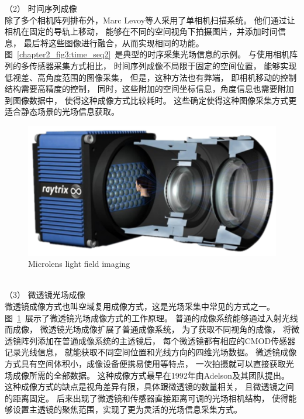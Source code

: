（2）
时间序列成像
\\
%
%
%
%
\indent
除了多个相机阵列排布外，Marc Levoy等人采用了单相机扫描系统。
他们通过让相机在固定的导轨上移动，
能够在不同的空间视角下拍摄图片，并添加时间信息，
最后将这些图像进行融合，从而实现相同的功能。
图~\ref{chapter2_fig3:time_seq2}~是典型的时序采集光场信息的示例。
与使用相机阵列的多传感器采集方式相比，
时间序列成像不局限于固定的空间位置，
能够实现低视差、高角度范围的图像采集，
但是，这种方法也有弊端，
即相机移动的控制结构需要高精度的控制，
同时，这些附加的空间坐标信息，角度信息也需要附加到图像数据中，
使得这种成像方式比较耗时。
这些确定使得这种图像采集方式更适合静态场景的光场信息获取。
\begin{figure}[b]
	\centering
	\includegraphics[width=0.65\linewidth]{figures/chapter2/microlens_for_lf_imaging2.drawio}
	{Microlens light field imaging}  
	\label{chapter2_fig4:microlens_for_lf_imaging}
\end{figure}
\\
%
%
%
%
\indent
（3）
微透镜光场成像
\\
%
%
%
%
\indent
微透镜成像方式也叫空域复用成像方式，这是光场采集中常见的方式之一。
图~\ref{chapter2_fig4:microlens_for_lf_imaging}~展示了微透镜光场成像方式的工作原理。
普通的成像系统能够通过入射光线而成像，
微透镜光场成像扩展了普通成像系统，
为了获取不同视角的成像，
将微透镜阵列添加在普通成像系统的主透镜后，
每个微透镜都有相应的CMOD传感器记录光线信息，
就能获取不同空间位置和光线方向的四维光场数据。
微透镜成像方式具有空间体积小，成像设备便携易使用等特点，
一次拍摄就可以直接获取光场成像所需的全部数据。
这种成像方式最早在1992年由Adelson及其团队提出。
这种成像方式的缺点是视角差异有限，具体跟微透镜的数量相关，
且微透镜之间的距离固定。
后来出现了微透镜和传感器直接距离可调的光场相机结构，
使得能够设置主透镜的聚焦范围，实现了更为灵活的光场信息采集方式。
